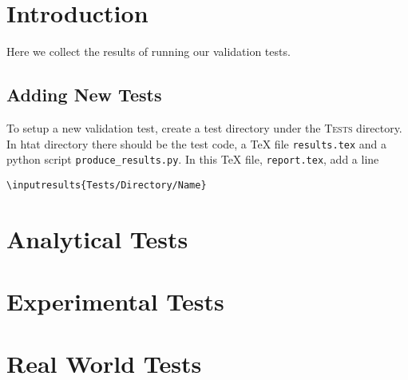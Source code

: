 \documentclass[11pt,a4paper]{report}
\begin{document}
 

\chapter{Introduction}

Here we collect the results of running our validation tests. 

\section{Adding New Tests}
To setup a new validation test, create a test directory under the \textsc{Tests} 
directory. In htat directory there should be the test code, a \TeX{} file \texttt{results.tex}
and a python script \texttt{produce\_results.py}. In this \TeX{} file, \texttt{report.tex}, add a 
line
\begin{verbatim}
\inputresults{Tests/Directory/Name}
\end{verbatim}

\chapter{Analytical Tests}


\chapter{Experimental Tests}


\chapter{Real World Tests}

\end{document}
